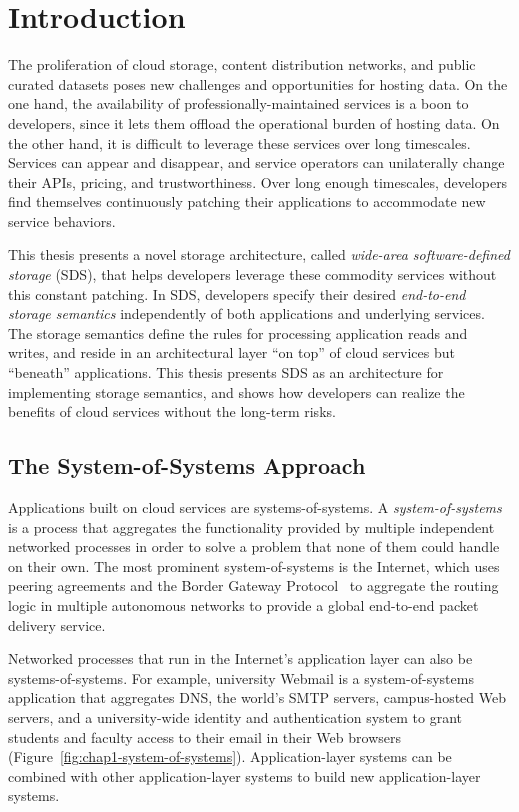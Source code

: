 \chapter{Introduction}
\label{chap:introduction}

The proliferation of cloud storage, content distribution networks, and 
public curated datasets poses new challenges and
opportunities for hosting data.  On the one hand, the availability of
professionally-maintained services is a boon to developers, since it lets them
offload the operational burden of hosting data.  On the other
hand, it is difficult to leverage these services over long
timescales.  Services can appear and disappear, and service operators can
unilaterally change their APIs, pricing, and trustworthiness.
Over long enough timescales, developers find themselves continuously
patching their applications to accommodate new service behaviors.

This thesis presents a novel storage architecture, called \emph{wide-area
software-defined storage} (SDS), that helps developers
leverage these commodity services without this constant patching.
In SDS, developers specify their desired
\emph{end-to-end storage semantics} independently of
both applications and underlying services.  The storage semantics define the
rules for processing application reads and writes, and reside in an architectural
layer ``on top'' of cloud services but ``beneath'' applications.
This thesis presents SDS as an architecture for implementing storage semantics, and
shows how developers can realize the benefits of cloud services without the
long-term risks.

\section{The System-of-Systems Approach}

Applications built on cloud services are systems-of-systems.
A \emph{system-of-systems} is a process that aggregates the
functionality provided by multiple independent networked processes
in order to solve a problem that none of them could
handle on their own.  The most prominent system-of-systems 
is the Internet, which uses peering agreements and the Border Gateway
Protocol~\cite{bgp} to aggregate the routing logic in
multiple autonomous networks to provide a global end-to-end packet delivery
service.

Networked processes that run in the Internet's application layer can also
be systems-of-systems.  For example, university Webmail is a
system-of-systems application that 
aggregates DNS, the world's SMTP servers, campus-hosted
Web servers, and a university-wide identity and authentication
system to grant students and faculty access to their email in their Web browsers
(Figure~\ref{fig:chap1-system-of-systems}).  Application-layer systems can be combined with other
application-layer systems to build new application-layer systems.

